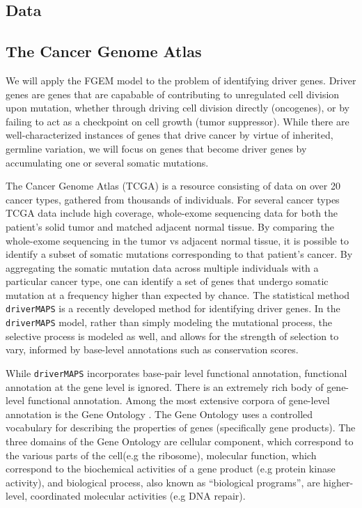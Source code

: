 \subsection{Data}\label{sec:org31ff9f1}

\subsection{The Cancer Genome Atlas}

We will apply the FGEM model to the problem of identifying driver genes.  Driver genes are genes that are capabable of contributing to unregulated cell division upon mutation, whether through driving cell division directly (oncogenes), or by failing to act as a checkpoint on cell growth (tumor suppressor).  While there are well-characterized instances of genes that drive cancer by virtue of inherited, germline variation, we will focus on genes that become driver genes
by accumulating one or several somatic mutations.

The Cancer Genome Atlas (TCGA) is a resource consisting of data on over 20 cancer types, gathered from thousands of individuals.  For several cancer types TCGA data include high coverage, whole-exome sequencing data for both the patient's solid tumor and matched adjacent normal tissue.  By comparing the whole-exome sequencing in the tumor vs adjacent normal tissue, it is possible to identify a subset of somatic mutations corresponding to that patient's cancer.  By aggregating the somatic mutation data across multiple individuals with a particular cancer type, one can identify a set of genes that undergo somatic mutation at a frequency higher than expected by chance.  The statistical method \texttt{driverMAPS} is a recently developed method for identifying driver genes. In the \texttt{driverMAPS} model, rather than simply modeling the mutational process, the selective process is modeled as well, and allows for the strength of selection to vary, informed by base-level annotations such as conservation scores.

While \texttt{driverMAPS} incorporates base-pair level functional annotation, functional annotation at the gene level is ignored.  There is an extremely rich body of gene-level functional annotation.  Among the most extensive corpora of gene-level annotation is the Gene Ontology \cite{GO}.  The Gene Ontology uses a controlled vocabulary for describing the properties of genes (specifically gene products).  The three domains of the Gene Ontology are cellular component, which correspond to the various parts of the cell(e.g the ribosome), molecular function, which correspond to the biochemical activities of a gene product (e.g protein kinase activity), and biological process, also known as ``biological programs'', are higher-level, coordinated molecular activities (e.g DNA repair).



